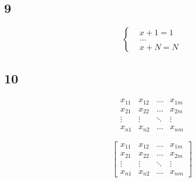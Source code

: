 \documentclass[a4paper,12pt]{article} %
\begin{document}
\subsection{9}





\[\left\{
\begin{aligned}
& x+1=1\\
& \ldots\\
& x + N = N
\end{aligned}
\right.\] 

\subsection{10}

\[ 
\begin{matrix} 
x_{11} & x_{12} & \ldots & x_{1m}\\ 
x_{21} & x_{22} & \ldots & x_{2m}\\ 
\vdots & \vdots & \ddots & \vdots\\ 
x_{n1} & x_{n2} & \ldots & x_{nm} 
\end{matrix} 
\] 

\[ 
\begin{bmatrix} 
x_{11} & x_{12} & \ldots & x_{1m}\\ 
x_{21} & x_{22} & \ldots & x_{2m}\\ 
\vdots & \vdots & \ddots & \vdots\\ 
x_{n1} & x_{n2} & \ldots & x_{nm} 
\end{bmatrix} 
\] 
\end{document}
